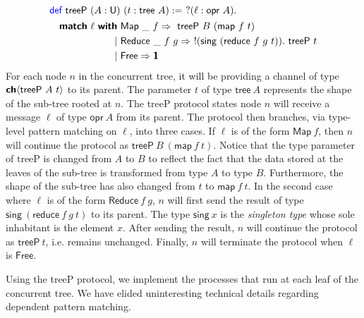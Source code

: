 \vspace{-1em}
\begingroup
\small
\addtolength{\jot}{-0.25em}
\begin{alignat*}{4}
  &\Def\ \textsf{treeP}\ (A : \Un)\ (t : \textsf{tree}\ A) :=\ ?(\ell : \textsf{opr}\ A).\\
  &\quad
    \begin{alignedat}{4}
      \Match\ \ell\ \With&\ \textsf{Map}\ \_\ f \Rightarrow\ \textsf{treeP}\ B\ (\textsf{map}\ f\ t) \\
                  \mid&\ \textsf{Reduce}\ \_\ f\ g \Rightarrow\ !(\textsf{sing}\ (\textsf{reduce}\ f\ g\ t)).\ \textsf{treeP}\ t \\
                  \mid&\ \textsf{Free} \Rightarrow \End
    \end{alignedat}
\end{alignat*}
\endgroup
For each node $n$ in the concurrent tree, it will be providing a channel of type
${\textbf{\textsf{ch}}\langle{\textsf{treeP}\ A\ t}\rangle}$ to its parent. The parameter $t$ of type
$\textsf{tree}\ A$ represents the shape of the sub-tree rooted at $n$. The
\textsf{treeP} protocol states node $n$ will receive a message $\ell$ of type
$\textsf{opr}\ A$ from its parent.  The protocol then branches, via type-level
pattern matching on $\ell$, into three cases. If $\ell$ is of the form
$\textsf{Map}\ f$, then $n$ will continue the protocol as
$\textsf{treeP}\ B\ (\textsf{map}\ f\ t)$. Notice that the type parameter of
\textsf{treeP} is changed from $A$ to $B$ to reflect the fact that the data
stored at the leaves of the sub-tree is transformed from type $A$ to type
$B$. Furthermore, the shape of the sub-tree has also changed from $t$ to
$\textsf{map}\ f\ t$. In the second case where $\ell$ is of the form
$\textsf{Reduce}\ f\ g$, $n$ will first send the result of type
$\textsf{sing}\ (\textsf{reduce}\ f\ g\ t)$ to its parent. The type
$\textsf{sing}\ x$ is the \emph{singleton type} whose sole inhabitant is the
element $x$. After sending the result, $n$ will continue the protocol as
$\textsf{treeP}\ t$, i.e. remains unchanged. Finally, $n$ will terminate
the protocol when $\ell$ is $\textsf{Free}$.

Using the \textsf{treeP} protocol, we implement the processes that run at
each leaf of the concurrent tree. We have elided uninteresting
technical details regarding dependent pattern matching.

